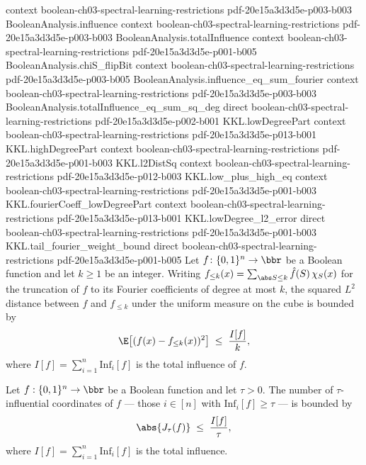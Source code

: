 \begin{lemma}
  {context}
  {boolean-ch03-spectral-learning-restrictions}
  {pdf-20e15a3d3d5e-p003-b003}
\proofstep
  {BooleanAnalysis.influence}
  {context}
  {boolean-ch03-spectral-learning-restrictions}
  {pdf-20e15a3d3d5e-p003-b003}
\proofstep
  {BooleanAnalysis.totalInfluence}
  {context}
  {boolean-ch03-spectral-learning-restrictions}
  {pdf-20e15a3d3d5e-p001-b005}
\proofstep
  {BooleanAnalysis.chiS_flipBit}
  {context}
  {boolean-ch03-spectral-learning-restrictions}
  {pdf-20e15a3d3d5e-p003-b005}
\proofstep
  {BooleanAnalysis.influence_eq_sum_fourier}
  {context}
  {boolean-ch03-spectral-learning-restrictions}
  {pdf-20e15a3d3d5e-p003-b003}
\proofstep
  {BooleanAnalysis.totalInfluence_eq_sum_sq_deg}
  {direct}
  {boolean-ch03-spectral-learning-restrictions}
  {pdf-20e15a3d3d5e-p002-b001}
\proofstep
  {KKL.lowDegreePart}
  {context}
  {boolean-ch03-spectral-learning-restrictions}
  {pdf-20e15a3d3d5e-p013-b001}
\proofstep
  {KKL.highDegreePart}
  {context}
  {boolean-ch03-spectral-learning-restrictions}
  {pdf-20e15a3d3d5e-p001-b003}
\proofstep
  {KKL.l2DistSq}
  {context}
  {boolean-ch03-spectral-learning-restrictions}
  {pdf-20e15a3d3d5e-p012-b003}
\proofstep
  {KKL.low_plus_high_eq}
  {context}
  {boolean-ch03-spectral-learning-restrictions}
  {pdf-20e15a3d3d5e-p001-b003}
\proofstep
  {KKL.fourierCoeff_lowDegreePart}
  {context}
  {boolean-ch03-spectral-learning-restrictions}
  {pdf-20e15a3d3d5e-p013-b001}
\proofstep
  {KKL.lowDegree_l2_error}
  {direct}
  {boolean-ch03-spectral-learning-restrictions}
  {pdf-20e15a3d3d5e-p001-b003}
\proofstep
  {KKL.tail_fourier_weight_bound}
  {direct}
  {boolean-ch03-spectral-learning-restrictions}
  {pdf-20e15a3d3d5e-p001-b005}
Let $f\colon\{0,1\}^n\to\bbr$ be a Boolean function and let $k\ge 1$ be an integer.
Writing $f_{\le k}(x)=\sum_{\abs S\le k}\hat f(S)\,\chi_S(x)$ for the truncation of $f$
to its Fourier coefficients of degree at most $k$, the squared $L^2$ distance between
$f$ and $f_{\le k}$ under the uniform measure on the cube is bounded by
\[
  \E\big[(f(x)-f_{\le k}(x))^2\big]\;\le\;\frac{I[f]}{k},
\]
where $I[f]=\sum_{i=1}^n\mathrm{Inf}_i[f]$ is the total influence of $f$.
\end{lemma}

\begin{lemma}
\label{KKL.influential_coords_card}
\leanok
{}
Let $f : \{0,1\}^n \to \bbr$ be a Boolean function and let $\tau > 0$. The number of
$\tau$-influential coordinates of $f$ — those $i \in [n]$ with $\mathrm{Inf}_i[f] \ge
\tau$ — is bounded by
\[
  \abs{J_\tau(f)} \;\le\; \frac{I[f]}{\tau},
\]
where $I[f] = \sum_{i=1}^n \mathrm{Inf}_i[f]$ is the total influence.
\end{lemma}

